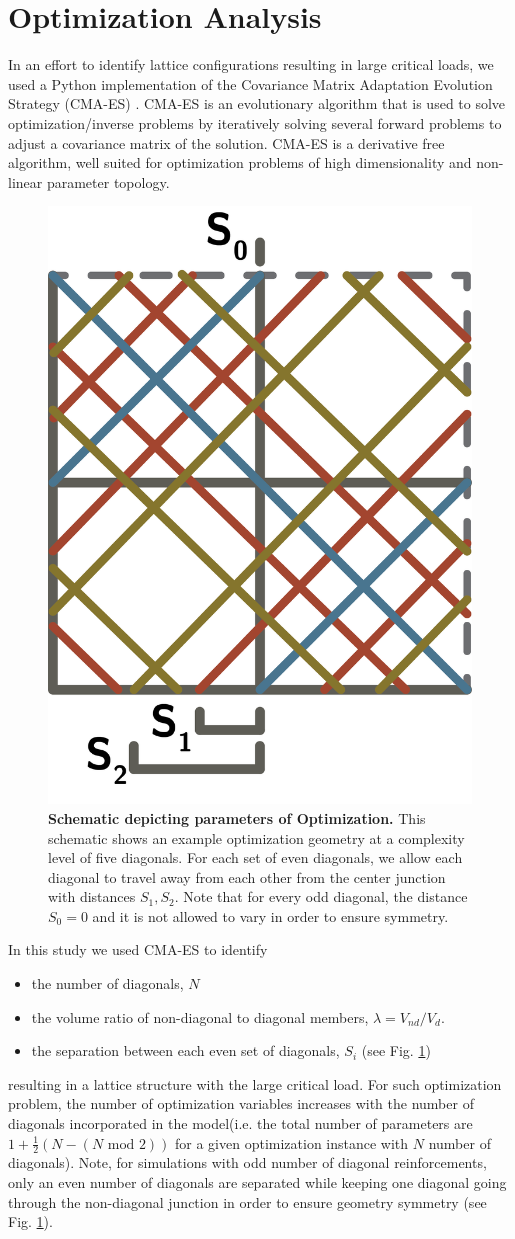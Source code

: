 \documentclass[10pt,twoside]{fernandes_supp}
\begin{document}
\section{Optimization Analysis}
In an effort to identify lattice configurations resulting in large critical loads, we used a Python implementation of the Covariance Matrix Adaptation Evolution Strategy (CMA-ES) \citep{hansen2003}. CMA-ES is an evolutionary
algorithm that is used to solve optimization/inverse problems by iteratively solving several forward problems to adjust a covariance matrix of the solution. CMA-ES is a derivative free algorithm, well suited for optimization problems of high dimensionality and non-linear parameter topology.

\begin{figure}
	\centering
	\includegraphics[width=0.25\linewidth]{SFig11.png}
	\caption{{\bf Schematic depicting parameters of Optimization.} This schematic shows an example optimization geometry  at a complexity level of five diagonals. For each set of even diagonals, we allow each diagonal to travel away from each other from the center junction with distances $S_1,S_2$. Note that for every odd diagonal, the distance $S_0=0$ and it is not allowed to vary in order to ensure symmetry.}
	\label{OptimizationSchematic}
\end{figure}

In this study we used CMA-ES to identify \begin{itemize} 
\item the number of diagonals, $N$
\item the volume ratio  of non-diagonal to diagonal members, $\lambda=V_{nd}/V_{d}$.
\item  the separation between each even set of diagonals, $S_i$ (see Fig. \ref{OptimizationSchematic})
\end{itemize}
resulting in a lattice structure with the large critical load. For such optimization problem, the number of optimization variables increases with the number of diagonals incorporated in the model(i.e. the total number of parameters are $1+ \frac{1}{2}(N - (N \text{ mod } 2))$ for a given optimization instance with $N$ number of diagonals).  Note, for simulations with odd number of diagonal reinforcements, only an even number of diagonals are separated while keeping one diagonal going through the non-diagonal junction in order to ensure geometry symmetry (see Fig. \ref{OptimizationSchematic}). 
\end{document}
